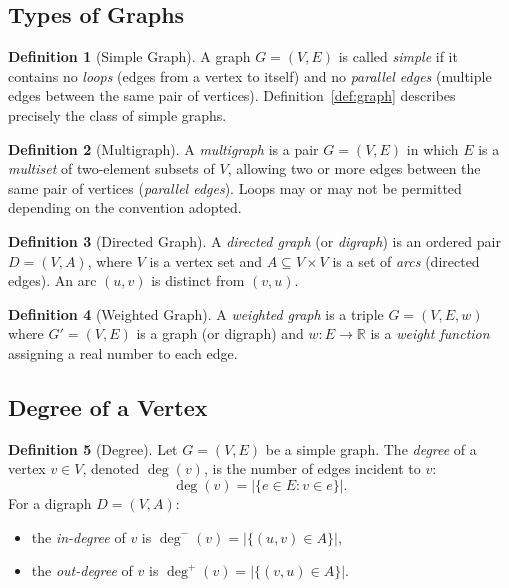 \documentclass[12pt,a4paper]{article}
\theoremstyle{definition}
\newtheorem{definition}{Definition}[section]
\theoremstyle{plain}
\newcommand{\dg}[1]{\deg(#1)}
\newcommand{\indeg}[1]{\deg^{-}(#1)}
\newcommand{\outdeg}[1]{\deg^{+}(#1)}
\begin{document}
\subsection{Types of Graphs}

\begin{definition}[Simple Graph]\label{def:simple}
  A graph \(G = (V,E)\) is called \emph{simple} if it contains no
  \emph{loops} (edges from a vertex to itself) and no \emph{parallel edges}
  (multiple edges between the same pair of vertices).  Definition~\ref{def:graph}
  describes precisely the class of simple graphs.
\end{definition}

\begin{definition}[Multigraph]\label{def:multi}
  A \emph{multigraph} is a pair \(G = (V, E)\) in which \(E\) is a
  \emph{multiset} of two-element subsets of \(V\), allowing two or more edges
  between the same pair of vertices (\emph{parallel edges}).  Loops may or may
  not be permitted depending on the convention adopted.
\end{definition}

\begin{definition}[Directed Graph]\label{def:digraph}
  A \emph{directed graph} (or \emph{digraph}) is an ordered pair
  \(D = (V, A)\), where \(V\) is a vertex set and
  \(A \subseteq V \times V\) is a set of \emph{arcs} (directed edges).
  An arc \((u,v)\) is distinct from \((v,u)\).
\end{definition}

\begin{definition}[Weighted Graph]\label{def:weighted}
  A \emph{weighted graph} is a triple \(G = (V, E, w)\) where
  \(G' = (V,E)\) is a graph (or digraph) and
  \(w : E \to \mathbb{R}\) is a \emph{weight function} assigning a real
  number to each edge.
\end{definition}

\subsection{Degree of a Vertex}

\begin{definition}[Degree]\label{def:degree}
  Let \(G = (V,E)\) be a simple graph.  The \emph{degree} of a vertex
  \(v \in V\), denoted \(\dg{v}\), is the number of edges incident to \(v\):
  \begin{equation}
    \dg{v} = \bigl|\{e \in E : v \in e\}\bigr|.
    \label{eq:degree}
  \end{equation}
  For a digraph \(D = (V,A)\):
  \begin{itemize}
    \item the \emph{in-degree} of \(v\) is
          \(\indeg{v} = |\{(u,v) \in A\}|\),
    \item the \emph{out-degree} of \(v\) is
          \(\outdeg{v} = |\{(v,u) \in A\}|\).
  \end{itemize}
\end{definition}
\end{document}
